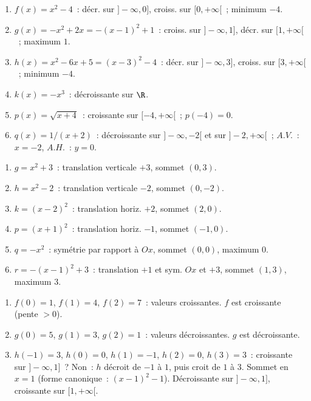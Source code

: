 
\begin{enumerate}
  \item $f(x)=x^2-4$~: d\'ecr. sur $]-\infty,0]$, croiss. sur $[0,+\infty[$~; minimum $-4$.
  \item $g(x)=-x^2+2x=-(x-1)^2+1$~: croiss. sur $]-\infty,1]$, d\'ecr. sur $[1,+\infty[$~; maximum $1$.
  \item $h(x)=x^2-6x+5=(x-3)^2-4$~: d\'ecr. sur $]-\infty,3]$, croiss. sur $[3,+\infty[$~; minimum $-4$.
  \item $k(x)=-x^3$~: d\'ecroissante sur $\R$.
  \item $p(x)=\sqrt{x+4}$~: croissante sur $[-4,+\infty[$~; $p(-4)=0$.
  \item $q(x)=1/(x+2)$~: d\'ecroissante sur $]-\infty,-2[$ et sur $]-2,+\infty[$~; $A.V.$~: $x=-2$, $A.H.$~: $y=0$.
\end{enumerate}


\begin{enumerate}
  \item $g=x^2+3$~: translation verticale $+3$, sommet $(0,3)$.
  \item $h=x^2-2$~: translation verticale $-2$, sommet $(0,-2)$.
  \item $k=(x-2)^2$~: translation horiz. $+2$, sommet $(2,0)$.
  \item $p=(x+1)^2$~: translation horiz. $-1$, sommet $(-1,0)$.
  \item $q=-x^2$~: sym\'etrie par rapport \`a $Ox$, sommet $(0,0)$, maximum $0$.
  \item $r=-(x-1)^2+3$~: translation $+1$ et sym. $Ox$ et $+3$, sommet $(1,3)$, maximum $3$.
\end{enumerate}


\begin{enumerate}
  \item $f(0)=1$, $f(1)=4$, $f(2)=7$~: valeurs croissantes. $f$ est croissante (pente $>0$).\checkmark
  \item $g(0)=5$, $g(1)=3$, $g(2)=1$~: valeurs d\'ecroissantes. $g$ est d\'ecroissante.\checkmark
  \item $h(-1)=3$, $h(0)=0$, $h(1)=-1$, $h(2)=0$, $h(3)=3$~:
        croissante sur $]-\infty,1]$~? Non~: $h$ d\'ecroit de $-1$ \`a $1$, puis croit de $1$ \`a $3$.
        Sommet en $x=1$ (forme canonique~: $(x-1)^2-1$).
        D\'ecroissante sur $]-\infty,1]$, croissante sur $[1,+\infty[$.
\end{enumerate}

